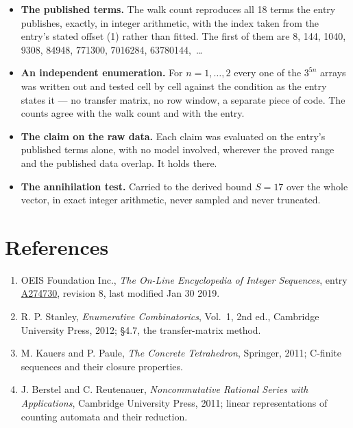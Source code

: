 \documentclass[11pt]{article}
\theoremstyle{definition}
\begin{document}
\begin{itemize}

\item {\bfseries The published terms.} The walk count reproduces all 18 terms the entry publishes, exactly, in integer arithmetic, with the index taken from the entry's stated offset (1) rather than fitted. The first of them are 8, 144, 1040, 9308, 84948, 771300, 7016284, 63780144,~\dots

\item {\bfseries An independent enumeration.} For $n = 1,\dots,2$ every one of the $3^{5n}$ arrays was written out and tested cell by cell against the condition as the entry states it --- no transfer matrix, no row window, a separate piece of code. The counts agree with the walk count and with the entry.

\item {\bfseries The claim on the raw data.} Each claim was evaluated on the entry's published terms alone, with no model involved, wherever the proved range and the published data overlap. It holds there.

\item {\bfseries The annihilation test.} Carried to the derived bound $S = 17$ over the whole vector, in exact integer arithmetic, never sampled and never truncated.

\end{itemize}

\section{References}

\begin{enumerate}

\item OEIS Foundation Inc., \emph{The On-Line Encyclopedia of Integer Sequences}, entry \href{https://oeis.org/A274730}{A274730}, revision 8, last modified Jan 30 2019.

\item R. P. Stanley, \emph{Enumerative Combinatorics}, Vol.~1, 2nd ed., Cambridge University Press, 2012; \S4.7, the transfer-matrix method.

\item M. Kauers and P. Paule, \emph{The Concrete Tetrahedron}, Springer, 2011; C-finite sequences and their closure properties.

\item J. Berstel and C. Reutenauer, \emph{Noncommutative Rational Series with Applications}, Cambridge University Press, 2011; linear representations of counting automata and their reduction.

\end{enumerate}
\end{document}
